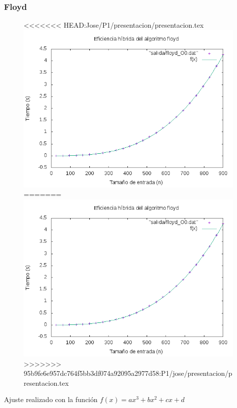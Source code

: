 \documentclass[spanish]{beamer}
\begin{document}
\begin{frame}\frametitle{Floyd}
  \begin{figure}[H]
    \centering   
<<<<<<< HEAD:Jose/P1/presentacion/presentacion.tex
        \includegraphics[clip,width=0.7\columnwidth]{../plots/floyd_O0_fit.png}%
=======
        \includegraphics[clip,width=0.8\columnwidth]{../plots/floyd_O0_fit.png}%
>>>>>>> 95b9fe6e957dc764f5bb3df074a92095a2977d58:P1/jose/presentacion/presentacion.tex
      \end{figure}

      Ajuste realizado con la función $f(x) = ax^3 + bx^2 + cx + d$
  \end{frame}
  
\end{document}
